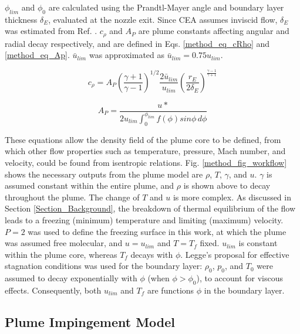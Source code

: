 \documentclass[journal]{new-aiaa}
\begin{document}
$\phi_{lim}$ and $\phi_0$ are calculated using the Prandtl-Mayer angle and boundary layer thickness $\delta_E$, evaluated at the nozzle exit. Since CEA assumes inviscid flow, $\delta_E$ was estimated from Ref. \cite{leggeModellingControlThruster1982}. $c_{\rho}$ and $A_P$ are plume constants affecting angular and radial decay respectively, and are defined in Eqs. \ref{method_eq_cRho} and \ref{method_eq_Ap}. ${\bar{u}}_{lim}$ was approximated as ${\bar{u}}_{lim} = 0.75 u_{lim}$.

\begin{equation}
c_{\rho} = A_P \left( \frac{\gamma +1}{\gamma - 1} \right)^{1/2}  \frac{2 {\bar{u}}_{lim}}{u_{lim}} \left( \frac{r_E}{2 \delta_E} \right) ^{\frac{\gamma -1}{\gamma +1}}
\label{method_eq_cRho}
\end{equation}

\begin{equation}
    A_P = \frac{u*}{2 u_{lim} \int_{0}^{\phi_{lim}} f(\phi) sin{\phi}  \,d\phi }
    \label{method_eq_Ap}
\end{equation}


These equations allow the density field of the plume core to be defined, from which other flow properties such as temperature, pressure, Mach number, and velocity, could be found from isentropic relations. Fig. \ref{method_fig_workflow} shows the necessary outputs from the plume model are $\rho$, $T$, $\gamma$, and $u$. $\gamma$ is assumed constant within the entire plume, and $\rho$ is shown above to decay throughout the plume. The change of $T$ and $u$ is more complex. As discussed in Section \ref{Section_Background}, the breakdown of thermal equilibrium of the flow leads to a freezing (minimum) temperature and limiting (maximum) velocity. $P=2$ was used to define the freezing surface in this work, at which the plume was assumed free molecular, and $u = u_{lim}$ and $T=T_f$ fixed. $u_{lim}$ is constant within the plume core, whereas $T_f$ decays with $\phi$. Legge's proposal for effective stagnation conditions was used for the boundary layer: $\rho_0$, $p_0$, and $T_0$ were assumed to decay exponentially with $\phi$ (when $\phi > \phi_0$), to account for viscous effects. Consequently, both $u_{lim}$ and $T_f$ are functions $\phi$ in the boundary layer. 

    
\subsection{Plume Impingement Model}
\end{document}
